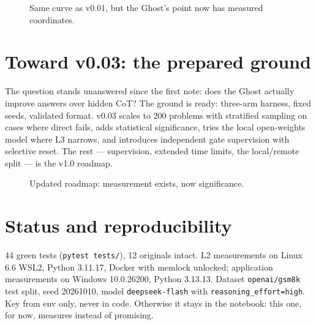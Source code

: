 \documentclass[11pt,a4paper]{article}
\begin{document}
\begin{figure}[h]
\centering
{}
\caption{Same curve as v0.01, but the Ghost's point now has measured coordinates.}
\end{figure}

\section{Toward v0.03: the prepared ground}
The question stands unanswered since the first note: does the Ghost actually improve
answers over hidden CoT? The ground is ready: three-arm harness, fixed seeds,
validated format. v0.03 scales to 200 problems with stratified sampling on cases
where direct fails, adds statistical significance, tries the local open-weights
model where L3 narrows, and introduces independent gate supervision with selective
reset. The rest --- supervision, extended time limits, the local/remote split ---
is the v1.0 roadmap.

\begin{figure}[h]
\centering
{}
\caption{Updated roadmap: measurement exists, now significance.}
\end{figure}

\section{Status and reproducibility}
44 green tests (\texttt{pytest tests/}), 12 originals intact. L2 measurements on
Linux 6.6 WSL2, Python 3.11.17, Docker with memlock unlocked; application
measurements on Windows 10.0.26200, Python 3.13.13. Dataset \texttt{openai/gsm8k}
test split, seed 20261010, model \texttt{deepseek-flash} with
\texttt{reasoning\_effort=high}. Key from env only, never in code. Otherwise it
stays in the notebook: this one, for now, measures instead of promising.
\end{document}
